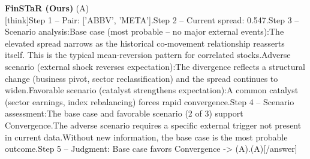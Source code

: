 \begin{minipage}[t]{0.41\textwidth}
\colorbox{green!10}{\parbox{\dimexpr\textwidth-2\fboxsep}{
\textbf{FinSTaR (Ours)} \textcolor{green!50!black}{(A)} \\[2pt]
\tiny
[think]\newline Step 1 -- Pair: ['ABBV', 'META'].\newline Step 2 -- Current spread: 0.547.\newline Step 3 -- Scenario analysis:\newline   Base case (most probable -- no major external events):\newline     The elevated spread narrows as the historical co-movement relationship reasserts itself. This is the typical mean-reversion pattern for correlated stocks.\newline   Adverse scenario (external shock reverses expectation):\newline     The divergence reflects a structural change (business pivot, sector reclassification) and the spread continues to widen.\newline   Favorable scenario (catalyst strengthens expectation):\newline     A common catalyst (sector earnings, index rebalancing) forces rapid convergence.\newline Step 4 -- Scenario assessment:\newline   The base case and favorable scenario (2 of 3) support Convergence.\newline   The adverse scenario requires a specific external trigger not present in current data.\newline   Without new information, the base case is the most probable outcome.\newline Step 5 -- Judgment: Base case favors Convergence -> (A).\newline [/think]\newline [answer](A)[/answer]
}}
\vspace{-30pt}
\end{minipage}
